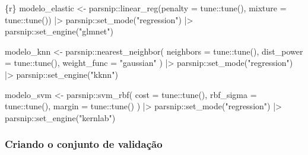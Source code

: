 \documentclass[
  letterpaper,
  DIV=11,
  numbers=noendperiod,
  oneside]{scrartcl}
\newenvironment{Shaded}{\begin{snugshade}}{\end{snugshade}}
\newcommand{\AttributeTok}[1]{\textcolor[rgb]{0.40,0.45,0.13}{#1}}
\newcommand{\FunctionTok}[1]{\textcolor[rgb]{0.28,0.35,0.67}{#1}}
\newcommand{\InformationTok}[1]{\textcolor[rgb]{0.37,0.37,0.37}{#1}}
\newcommand{\NormalTok}[1]{\textcolor[rgb]{0.00,0.23,0.31}{#1}}
\newcommand{\OtherTok}[1]{\textcolor[rgb]{0.00,0.23,0.31}{#1}}
\newcommand{\SpecialCharTok}[1]{\textcolor[rgb]{0.37,0.37,0.37}{#1}}
\newcommand{\StringTok}[1]{\textcolor[rgb]{0.13,0.47,0.30}{#1}}
\begin{document}
\begin{Shaded}
\begin{Highlighting}[]
\InformationTok{\textasciigrave{}\textasciigrave{}\textasciigrave{}\{r\}}
\NormalTok{modelo\_elastic }\OtherTok{\textless{}{-}} 
\NormalTok{  parsnip}\SpecialCharTok{::}\FunctionTok{linear\_reg}\NormalTok{(}\AttributeTok{penalty =}\NormalTok{ tune}\SpecialCharTok{::}\FunctionTok{tune}\NormalTok{(), }\AttributeTok{mixture =}\NormalTok{ tune}\SpecialCharTok{::}\FunctionTok{tune}\NormalTok{()) }\SpecialCharTok{|\textgreater{}} 
\NormalTok{  parsnip}\SpecialCharTok{::}\FunctionTok{set\_mode}\NormalTok{(}\StringTok{"regression"}\NormalTok{) }\SpecialCharTok{|\textgreater{}} 
\NormalTok{  parsnip}\SpecialCharTok{::}\FunctionTok{set\_engine}\NormalTok{(}\StringTok{"glmnet"}\NormalTok{)}

\NormalTok{modelo\_knn }\OtherTok{\textless{}{-}}
\NormalTok{  parsnip}\SpecialCharTok{::}\FunctionTok{nearest\_neighbor}\NormalTok{(}
    \AttributeTok{neighbors =}\NormalTok{ tune}\SpecialCharTok{::}\FunctionTok{tune}\NormalTok{(),}
    \AttributeTok{dist\_power =}\NormalTok{ tune}\SpecialCharTok{::}\FunctionTok{tune}\NormalTok{(), }
    \AttributeTok{weight\_func =} \StringTok{"gaussian"} 
\NormalTok{  ) }\SpecialCharTok{|\textgreater{}} 
\NormalTok{  parsnip}\SpecialCharTok{::}\FunctionTok{set\_mode}\NormalTok{(}\StringTok{"regression"}\NormalTok{) }\SpecialCharTok{|\textgreater{}} 
\NormalTok{  parsnip}\SpecialCharTok{::}\FunctionTok{set\_engine}\NormalTok{(}\StringTok{"kknn"}\NormalTok{)}

\NormalTok{modelo\_svm }\OtherTok{\textless{}{-}} 
\NormalTok{  parsnip}\SpecialCharTok{::}\FunctionTok{svm\_rbf}\NormalTok{(}
    \AttributeTok{cost =}\NormalTok{ tune}\SpecialCharTok{::}\FunctionTok{tune}\NormalTok{(),}
    \AttributeTok{rbf\_sigma =}\NormalTok{ tune}\SpecialCharTok{::}\FunctionTok{tune}\NormalTok{(),}
    \AttributeTok{margin =}\NormalTok{ tune}\SpecialCharTok{::}\FunctionTok{tune}\NormalTok{()}
\NormalTok{  ) }\SpecialCharTok{|\textgreater{}} 
\NormalTok{  parsnip}\SpecialCharTok{::}\FunctionTok{set\_mode}\NormalTok{(}\StringTok{"regression"}\NormalTok{) }\SpecialCharTok{|\textgreater{}} 
\NormalTok{  parsnip}\SpecialCharTok{::}\FunctionTok{set\_engine}\NormalTok{(}\StringTok{"kernlab"}\NormalTok{)}
\InformationTok{\textasciigrave{}\textasciigrave{}\textasciigrave{}}
\end{Highlighting}
\end{Shaded}

\hypertarget{criando-o-conjunto-de-validauxe7uxe3o}{%
\subsubsection{Criando o conjunto de
validação}\label{criando-o-conjunto-de-validauxe7uxe3o}}
\end{document}

